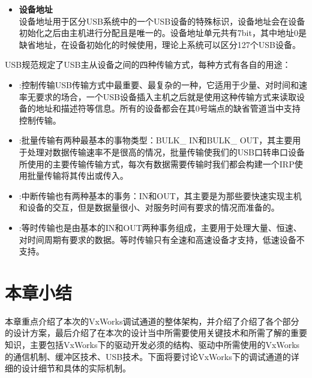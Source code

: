\begin{itemize}
	\item \textbf{设备地址}\\
	设备地址用于区分USB系统中的一个USB设备的特殊标识，设备地址会在设备初始化之后由主机进行分配且是唯一的。设备地址单元共有7bit，其中地址0是缺省地址，在设备初始化的时候使用，理论上系统可以区分127个USB设备\cite{李雪红2004USB}。
	\end{itemize}	



\noindent USB规范规定了USB主从设备之间的四种传输方式，每种方式有各自的用途\cite{USB总线接口开发指南}：

\begin{itemize}
\item {}:控制传输USB传输方式中最重要、最复杂的一种，它适用于少量、对时间和速率无要求的场合，一个USB设备插入主机之后就是使用这种传输方式来读取设备的地址和描述符等信息。所有的设备都会在其0号端点的缺省管道当中支持控制传输\cite{张杰2008基于}。
\item {}:批量传输有两种最基本的事物类型：BULK\_ IN和BULK\_ OUT，其主要用于处理对数据传输速率不是很高的情况，批量传输使我们的USB口转串口设备所使用的主要传输传输方式，每次有数据需要传输时我们都会构建一个IRP使用批量传输将其传出或传入。
\item {}:中断传输也有两种基本的事务：IN和OUT，其主要是为那些要快速实现主机和设备的交互，但是数据量很小、对服务时间有要求的情况而准备的。
\item {}:等时传输也是由基本的IN和OUT两种事务组成，主要用于处理大量、恒速、对时间周期有要求的数据。等时传输只有全速和高速设备才支持，低速设备不支持\cite{张杰2008基于}。
\end{itemize}


	

\section{本章小结}
	本章重点介绍了本次的VxWorks调试通道的整体架构，并介绍了介绍了各个部分的设计方案，最后介绍了在本次的设计当中所需要使用关键技术和所需了解的重要知识，主要包括VxWorks下的驱动开发必须的结构、驱动中所需使用的VxWorks的通信机制、缓冲区技术、USB技术。下面将要讨论VxWorks下的调试通道的详细的设计细节和具体的实际机制。

























